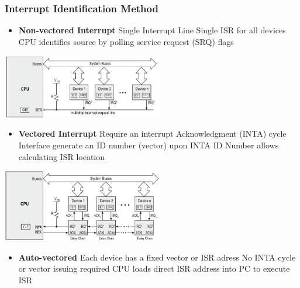 \begin{minipage}{11cm}
        \subsubsection{Interrupt Identification Method }
    \begin{itemize}
		\item \textbf{Non-vectored Interrupt}
		\subitem Single Interrupt Line
		\subitem Single ISR for all devices
		\subitem CPU identifies source by polling service request (SRQ) flags
    \end{itemize}
\end{minipage}	
	\begin{minipage}{8cm}
		\hspace{0.5cm}\includegraphics[width=7cm]{images/nonvectored.png}
	\end{minipage}
	\begin{minipage}{11cm}
            \begin{itemize}
		\item \textbf{Vectored Interrupt}
		\subitem Require an interrupt Acknowledgment (INTA) cycle
		\subitem Interface generate an ID number (vector) upon INTA
		\subitem ID Number allows calculating ISR location
    \end{itemize}
	\end{minipage}
		\begin{minipage}{8cm}
		\hspace{0.5cm}\includegraphics[width=7cm]{images/vectored.png}
	\end{minipage}
    \begin{itemize}
	\item \textbf{Auto-vectored}
	\subitem Each device has a fixed vector or ISR adress
	\subitem No INTA cycle or vector issuing required
	\subitem CPU loads direct ISR address into PC to execute ISR
\end{itemize}

